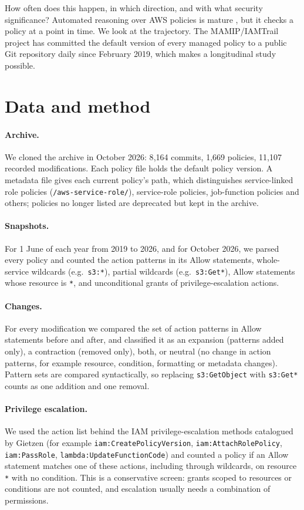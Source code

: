 \documentclass[11pt]{article}
\begin{document}
How often does this happen, in which direction, and with what security significance? Automated reasoning over AWS policies is mature
\cite{backes2018zelkova,bouchet2020blockpublic}, but it checks a policy at a point in time. We look at the trajectory. The
MAMIP/IAMTrail project \cite{mamip} has committed the default version of every managed policy to a public Git repository daily since
February 2019, which makes a longitudinal study possible.

\section{Data and method}
\paragraph{Archive.} We cloned the archive in October 2026: 8{,}164 commits, 1{,}669 policies, 11{,}107 recorded modifications. Each
policy file holds the default policy version. A metadata file gives each current policy's path, which distinguishes service-linked
role policies (\texttt{/aws-service-role/}), service-role policies, job-function policies and others; policies no longer listed are
deprecated but kept in the archive.

\paragraph{Snapshots.} For 1 June of each year from 2019 to 2026, and for October 2026, we parsed every policy and counted the action
patterns in its Allow statements, whole-service wildcards (e.g.\ \texttt{s3:*}), partial wildcards (e.g.\ \texttt{s3:Get*}), Allow
statements whose resource is \texttt{*}, and unconditional grants of privilege-escalation actions.

\paragraph{Changes.} For every modification we compared the set of action patterns in Allow statements before and after, and classified
it as an expansion (patterns added only), a contraction (removed only), both, or neutral (no change in action patterns, for example
resource, condition, formatting or metadata changes). Pattern sets are compared syntactically, so replacing \texttt{s3:GetObject} with
\texttt{s3:Get*} counts as one addition and one removal.

\paragraph{Privilege escalation.} We used the action list behind the IAM privilege-escalation methods catalogued by Gietzen
\cite{gietzen2018} (for example \texttt{iam:CreatePolicyVersion}, \texttt{iam:AttachRolePolicy}, \texttt{iam:PassRole},
\texttt{lambda:UpdateFunctionCode}) and counted a policy if an Allow statement matches one of these actions, including through wildcards,
on resource \texttt{*} with no condition. This is a conservative screen: grants scoped to resources or conditions are not counted, and
escalation usually needs a combination of permissions.
\end{document}
